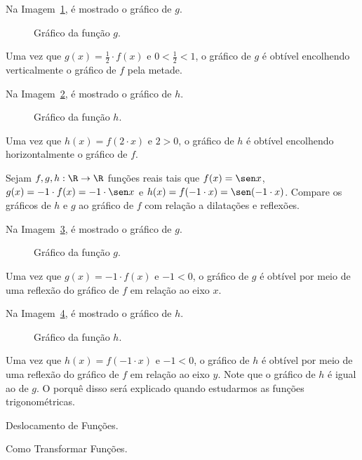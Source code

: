 \begin{solution}
Na Imagem~\ref{img:dilatacao-exemplo1-g}, é mostrado o gráfico de $g$.
  \begin{figure}
    \centering
    
    \caption{Gráfico da função $g$.}
    \label{img:dilatacao-exemplo1-g}
  \end{figure}
\noindent Uma vez que $g(x) = \frac 1 2 \cdot f(x)$ e $0 < \frac 1 2 < 1$, o gráfico de $g$ é obtível encolhendo verticalmente o gráfico de $f$ pela metade.

Na Imagem~\ref{img:dilatacao-exemplo1-h}, é mostrado o gráfico de $h$.
%
  \begin{figure}
    \centering
    
    \caption{Gráfico da função $h$.}
    \label{img:dilatacao-exemplo1-h}
  \end{figure}
\noindent Uma vez que $h(x) = f(2 \cdot x)$ e $2>0$, o gráfico de $h$ é obtível encolhendo horizontalmente o gráfico de $f$.
\end{solution}

\begin{example}
Sejam $f, g , h: \R \to \R$ funções reais tais que $f(x) = \sen x$, $g(x) = -1 \cdot f(x)  = -1 \cdot \sen x $ e $h(x)= f(-1 \cdot x)= \sen (-1 \cdot x)$.
Compare os gráficos de $h$ e $g$ ao gráfico de $f$ com relação a dilatações e reflexões.
\end{example}

\begin{solution}
Na Imagem~\ref{img:dilatacao-exemplo2-g}, é mostrado o gráfico de $g$.
%
  \begin{figure}
    \centering
    
    \caption{Gráfico da função $g$.}
    \label{img:dilatacao-exemplo2-g}
  \end{figure}
%
\noindent Uma vez que $g(x) = -1 \cdot f(x)$ e $-1 < 0$, o gráfico de $g$ é obtível por meio de uma reflexão do gráfico de $f$ em relação ao eixo $x$.

Na Imagem~\ref{img:dilatacao-exemplo2-h}, é mostrado o gráfico de $h$.
%
  \begin{figure}
    \centering
    
    \caption{Gráfico da função $h$.}
    \label{img:dilatacao-exemplo2-h}
  \end{figure}
\noindent Uma vez que $h(x)= f(-1 \cdot x)$ e $-1 < 0$, o gráfico de $h$ é obtível por meio de uma reflexão do gráfico de $f$ em relação ao eixo $y$.
Note que o gráfico de $h$ é igual ao de $g$. 
O porquê disso será explicado quando estudarmos as funções trigonométricas.
\end{solution}

  

\begin{onlineact}
    {Deslocamento de Funções}.
\end{onlineact}

\begin{onlineact}
    {Como Transformar Funções}.
\end{onlineact}